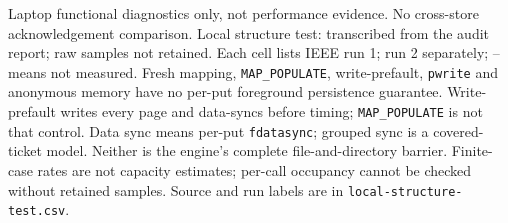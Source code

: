 \begin{table}[H]\centering{}
\caption{Laptop functional diagnostics only, not performance evidence. No cross-store acknowledgement comparison. Local structure test: transcribed from the audit report; raw samples not retained. Each cell lists IEEE run 1; run 2 separately; -- means not measured. Fresh mapping, \texttt{MAP\_POPULATE}, write-prefault, \texttt{pwrite} and anonymous memory have no per-put foreground persistence guarantee. Write-prefault writes every page and data-syncs before timing; \texttt{MAP\_POPULATE} is not that control. Data sync means per-put \texttt{fdatasync}; grouped sync is a covered-ticket model. Neither is the engine's complete file-and-directory barrier. Finite-case rates are not capacity estimates; per-call occupancy cannot be checked without retained samples. Source and run labels are in \texttt{local-structure-test.csv}.}\label{tab:local-structure}
\end{table}


